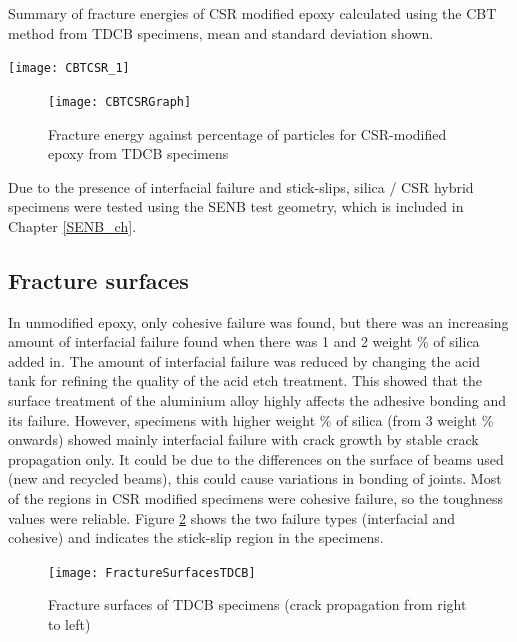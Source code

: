 \documentclass[numbers=noendperiod,chapterprefix=on]{icldt} %
\begin{document}
\begin{table}[!htpb]
\centering
\caption{Summary of fracture energies of CSR modified epoxy calculated using the CBT method from TDCB specimens, mean and standard deviation shown.} \label{CBTCSR_1}
\texttt{[image: CBTCSR\_1]}
\end{table}
\FloatBarrier

\begin{figure}[!htpb]
\centering
\texttt{[image: CBTCSRGraph]}
\caption{Fracture energy against percentage of particles for CSR-modified epoxy from TDCB specimens} \label{CBTCSRGraph}
\end{figure}
\FloatBarrier

Due to the presence of interfacial failure and stick-slips, silica / CSR hybrid specimens were tested using the SENB test geometry, which is included in Chapter \ref{SENB_ch}.

\subsection{Fracture surfaces}
In unmodified epoxy, only cohesive failure was found, but there was an increasing amount of interfacial failure found when there was 1 and 2 weight \% of silica added in. The amount of interfacial failure was reduced by changing the acid tank for refining the quality of the acid etch treatment. This showed that the surface treatment of the aluminium alloy highly affects the adhesive bonding and its failure. However, specimens with higher weight \% of silica (from 3 weight \% onwards) showed mainly interfacial failure with crack growth by stable crack propagation only. It could be due to the differences on the surface of beams used (new and recycled beams), this could cause variations in bonding of joints. Most of the regions in CSR modified specimens were cohesive failure, so the toughness values were reliable. Figure \ref{FractureSurfacesTDCB} shows the two failure types (interfacial and cohesive) and indicates the stick-slip region in the specimens. 

\begin{figure}[!htpb]
\centering
\texttt{[image: FractureSurfacesTDCB]}
\caption{Fracture surfaces of TDCB specimens (crack propagation from right to left)} \label{FractureSurfacesTDCB}
\end{figure}
\FloatBarrier
\end{document}
